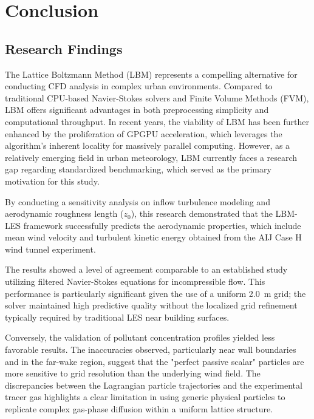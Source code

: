 \section{Conclusion}
\subsection{Research Findings}
The Lattice Boltzmann Method (LBM) represents a compelling alternative for conducting CFD analysis in complex urban environments. Compared to traditional CPU-based Navier-Stokes solvers and Finite Volume Methods (FVM), LBM offers significant advantages in both preprocessing simplicity and computational throughput. In recent years, the viability of LBM has been further enhanced by the proliferation of GPGPU acceleration, which leverages the algorithm's inherent locality for massively parallel computing. However, as a relatively emerging field in urban meteorology, LBM currently faces a research gap regarding standardized benchmarking, which served as the primary motivation for this study.

By conducting a sensitivity analysis on inflow turbulence modeling and aerodynamic roughness length ($z_0$), this research demonstrated that the LBM-LES framework successfully predicts the aerodynamic properties, which include mean wind velocity and turbulent kinetic energy obtained from the AIJ Case H wind tunnel experiment. 

The results showed a level of agreement comparable to an established study utilizing filtered Navier-Stokes equations for incompressible flow. This performance is particularly significant given the use of a uniform 2.0~m grid; the solver maintained high predictive quality without the localized grid refinement typically required by traditional LES near building surfaces.

Conversely, the validation of pollutant concentration profiles yielded less favorable results. The inaccuracies observed, particularly near wall boundaries and in the far-wake region, suggest that the "perfect passive scalar" particles are more sensitive to grid resolution than the underlying wind field. The discrepancies between the Lagrangian particle trajectories and the experimental tracer gas highlights a clear limitation in using generic physical particles to replicate complex gas-phase diffusion within a uniform lattice structure.

\newpage

